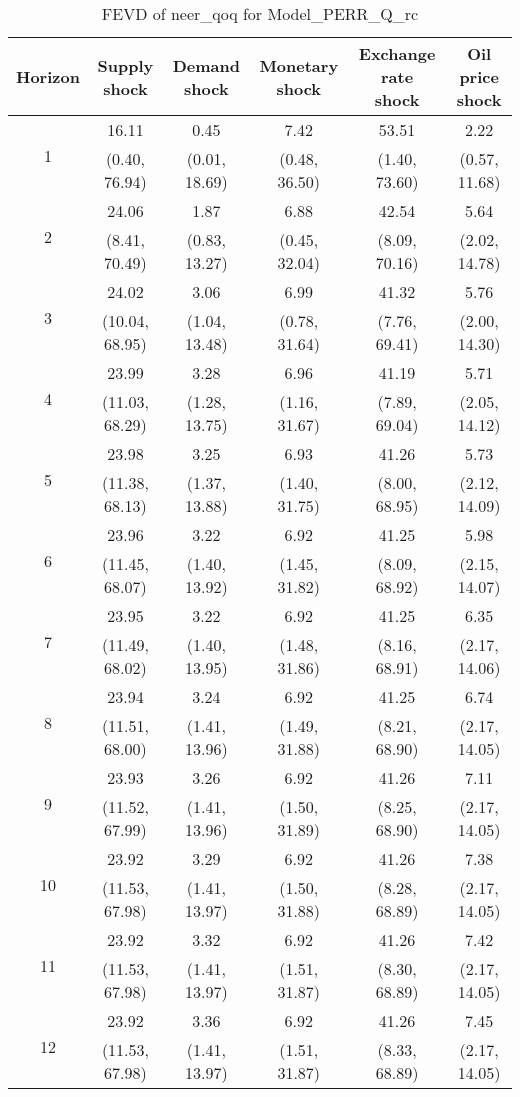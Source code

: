 \documentclass{article}
\begin{document}
\begin{table}
	\footnotesize
	\caption{FEVD of neer_qoq for Model_PERR_Q_rc}
	\begin{tabular}{cccccc}
		Horizon & Supply shock & Demand shock & Monetary shock & Exchange rate shock & Oil price shock\\ \hline
		\multirow{2}{*}{1} & 16.11 & 0.45 & 7.42 & 53.51 & 2.22\\
		 & (0.40, 76.94) & (0.01, 18.69) & (0.48, 36.50) & (1.40, 73.60) & (0.57, 11.68)\\
		\multirow{2}{*}{2} & 24.06 & 1.87 & 6.88 & 42.54 & 5.64\\
		 & (8.41, 70.49) & (0.83, 13.27) & (0.45, 32.04) & (8.09, 70.16) & (2.02, 14.78)\\
		\multirow{2}{*}{3} & 24.02 & 3.06 & 6.99 & 41.32 & 5.76\\
		 & (10.04, 68.95) & (1.04, 13.48) & (0.78, 31.64) & (7.76, 69.41) & (2.00, 14.30)\\
		\multirow{2}{*}{4} & 23.99 & 3.28 & 6.96 & 41.19 & 5.71\\
		 & (11.03, 68.29) & (1.28, 13.75) & (1.16, 31.67) & (7.89, 69.04) & (2.05, 14.12)\\
		\multirow{2}{*}{5} & 23.98 & 3.25 & 6.93 & 41.26 & 5.73\\
		 & (11.38, 68.13) & (1.37, 13.88) & (1.40, 31.75) & (8.00, 68.95) & (2.12, 14.09)\\
		\multirow{2}{*}{6} & 23.96 & 3.22 & 6.92 & 41.25 & 5.98\\
		 & (11.45, 68.07) & (1.40, 13.92) & (1.45, 31.82) & (8.09, 68.92) & (2.15, 14.07)\\
		\multirow{2}{*}{7} & 23.95 & 3.22 & 6.92 & 41.25 & 6.35\\
		 & (11.49, 68.02) & (1.40, 13.95) & (1.48, 31.86) & (8.16, 68.91) & (2.17, 14.06)\\
		\multirow{2}{*}{8} & 23.94 & 3.24 & 6.92 & 41.25 & 6.74\\
		 & (11.51, 68.00) & (1.41, 13.96) & (1.49, 31.88) & (8.21, 68.90) & (2.17, 14.05)\\
		\multirow{2}{*}{9} & 23.93 & 3.26 & 6.92 & 41.26 & 7.11\\
		 & (11.52, 67.99) & (1.41, 13.96) & (1.50, 31.89) & (8.25, 68.90) & (2.17, 14.05)\\
		\multirow{2}{*}{10} & 23.92 & 3.29 & 6.92 & 41.26 & 7.38\\
		 & (11.53, 67.98) & (1.41, 13.97) & (1.50, 31.88) & (8.28, 68.89) & (2.17, 14.05)\\
		\multirow{2}{*}{11} & 23.92 & 3.32 & 6.92 & 41.26 & 7.42\\
		 & (11.53, 67.98) & (1.41, 13.97) & (1.51, 31.87) & (8.30, 68.89) & (2.17, 14.05)\\
		\multirow{2}{*}{12} & 23.92 & 3.36 & 6.92 & 41.26 & 7.45\\
		 & (11.53, 67.98) & (1.41, 13.97) & (1.51, 31.87) & (8.33, 68.89) & (2.17, 14.05)\\
	\end{tabular}
\label{tab:fevd-Model_PERR_Q_rc-neer_qoq}
\end{table}
\end{document}

